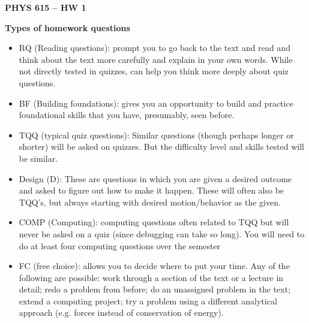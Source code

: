 \documentclass[12pt]{article}
\newcommand{\shortlist}{%
\parindent 0in%
\parskip   0in%
\itemsep   0in%
\topsep    0in%
\parsep    0in%
}
\newcommand{\Title}{PHYS 615 -- HW 1}
\begin{document}
\begin{center}
{\Large\bfseries\Title}

\end{center}
\bigskip
\bigskip


\textbf{Types of homework questions}
\begin{itemize}\shortlist
\item	RQ (Reading questions):  prompt you to go back to the text and read and think about the text more carefully and explain in your own words. While not directly tested in quizzes, can help you think more deeply about quiz questions.
\item	BF (Building foundations):  gives you an opportunity to build and practice foundational skills that you have, presumably, seen before.
\item	TQQ (typical quiz questions):   Similar questions (though perhaps longer or shorter) will be asked on quizzes.  But the difficulty level and skills tested will be similar.
\item Design (D):  These are questions in which you are given a desired outcome and asked to figure out how to make it happen.  These will often also be TQQ’s, but always starting with desired motion/behavior as the given.
\item	COMP (Computing): computing questions often related to TQQ but will never be asked on a quiz (since debugging can take so long).  You will need to do at least four computing questions over the semester
\item	FC (free choice): allows you to decide where to put your time.  Any of the following are possible:  work through a section of the text or a lecture in detail; redo a problem from before; do an unassigned problem in the text; extend a computing project; try a problem using a different analytical approach (e.g. forces instead of conservation of energy).
\end{itemize}
\end{document}
